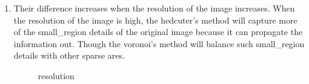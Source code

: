 \documentclass[11pt]{article}
\begin{document}
\begin{enumerate}
  \item Their difference increases when the resolution of the image increases. When the resolution of the image is high, the hedcuter's method will capture more of the small\_region details of the original image because it can propagate the information out. Though the voronoi's method will balance such small\_region details with other sparse ares.
  \begin{figure}[h!]
      \centering
      \qquad
      \qquad
      \qquad
      \caption{resolution}
      \label{fig:klayman-hedcuter}
  \end{figure}
  

\end{enumerate}
\end{document}
